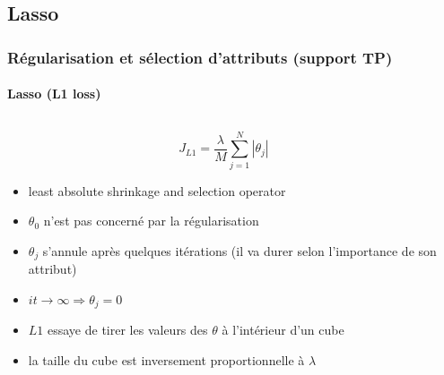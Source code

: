 \documentclass[xcolor=table]{beamer}
\begin{document}
\subsection{Lasso}

\begin{frame}
	\frametitle{Régularisation et sélection d'attributs (support TP)}
	\framesubtitle{Lasso (L1 loss)}
	
	\begin{columns}
		\begin{column}{.6\textwidth}
			\[J_{L1} = \frac{\lambda}{M} \sum_{j=1}^{N} |\theta_j|\]
	
			\begin{itemize}
				\item least absolute shrinkage and selection operator
				\item $\theta_0$ n'est pas concerné par la régularisation
				\item $\theta_j$ s'annule après quelques itérations (il va durer selon l'importance de son attribut)
				\item $it \rightarrow \infty \Rightarrow \theta_j = 0$
				\item $L1$ essaye de tirer les valeurs des $\theta$ à l'intérieur d'un cube
				\item la taille du cube est inversement proportionnelle à $\lambda$
			\end{itemize}
		\end{column}
		\begin{column}{.4\textwidth}
		\end{column}
	\end{columns}
	
\end{frame}
\end{document}
